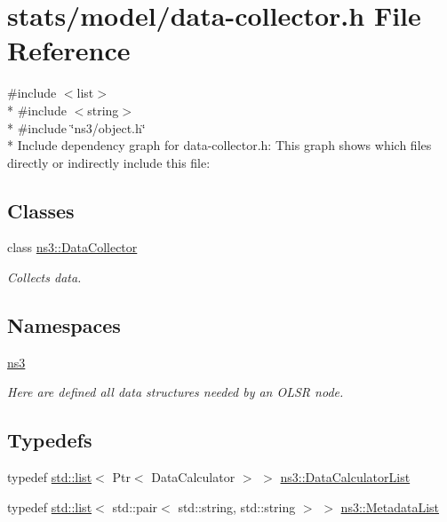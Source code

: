 \hypertarget{data-collector_8h}{}\section{stats/model/data-\/collector.h File Reference}
\label{data-collector_8h}
{\ttfamily \#include $<$list$>$}\\*
{\ttfamily \#include $<$string$>$}\\*
{\ttfamily \#include \char`\"{}ns3/object.\+h\char`\"{}}\\*
Include dependency graph for data-\/collector.h\+:
This graph shows which files directly or indirectly include this file\+:
\subsection*{Classes}
\begin{DoxyCompactItemize}
\item 
class \hyperlink{classns3_1_1DataCollector}{ns3\+::\+Data\+Collector}
\begin{DoxyCompactList}\small\item\em Collects data. \end{DoxyCompactList}\end{DoxyCompactItemize}
\subsection*{Namespaces}
\begin{DoxyCompactItemize}
\item 
 \hyperlink{namespacens3}{ns3}
\begin{DoxyCompactList}\small\item\em Here are defined all data structures needed by an O\+L\+SR node. \end{DoxyCompactList}\end{DoxyCompactItemize}
\subsection*{Typedefs}
\begin{DoxyCompactItemize}
\item 
typedef \hyperlink{openflow-interface_8h_afd9bcfa176617760671b67580f536fa7}{std\+::list}$<$ Ptr$<$ Data\+Calculator $>$ $>$ \hyperlink{namespacens3_a4ae834d03a85967043755b48477387f8}{ns3\+::\+Data\+Calculator\+List}
\item 
typedef \hyperlink{openflow-interface_8h_afd9bcfa176617760671b67580f536fa7}{std\+::list}$<$ std\+::pair$<$ std\+::string, std\+::string $>$ $>$ \hyperlink{namespacens3_a6b8f3e2afae01465bf2e0062290d0ee9}{ns3\+::\+Metadata\+List}
\end{DoxyCompactItemize}
